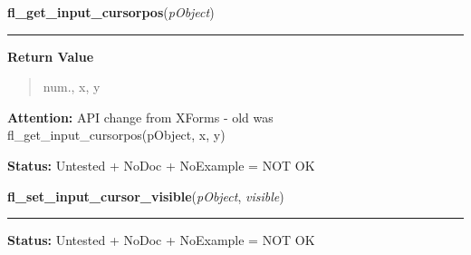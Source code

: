     \vspace{0.5ex}

\hspace{.8\funcindent}\begin{boxedminipage}{\funcwidth}

    \raggedright \textbf{fl\_get\_input\_cursorpos}(\textit{pObject})

    \vspace{-1.5ex}

    \rule{\textwidth}{0.5\fboxrule}
\setlength{\parskip}{2ex}
\setlength{\parskip}{1ex}
      \textbf{Return Value}
    \vspace{-1ex}

      \begin{quote}
      num., x, y

      \end{quote}

\textbf{Attention:} API change from XForms - old was fl\_get\_input\_cursorpos(pObject, x, y)



\textbf{Status:} Untested + NoDoc + NoExample = NOT OK



    \end{boxedminipage}

    \label{xformslib:library:fl_set_input_cursor_visible}

    \vspace{0.5ex}

\hspace{.8\funcindent}\begin{boxedminipage}{\funcwidth}

    \raggedright \textbf{fl\_set\_input\_cursor\_visible}(\textit{pObject}, \textit{visible})

    \vspace{-1.5ex}

    \rule{\textwidth}{0.5\fboxrule}
\setlength{\parskip}{2ex}
\setlength{\parskip}{1ex}
\textbf{Status:} Untested + NoDoc + NoExample = NOT OK



    \end{boxedminipage}

    \label{xformslib:library:fl_get_input_numberoflines}

